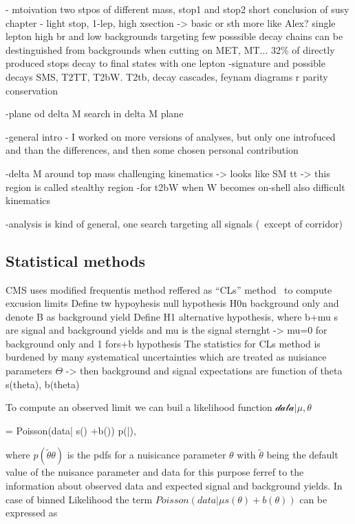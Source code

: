 - mtoivation
	two stpos of different mass, stop1 and stop2
	short conclusion of susy chapter - light stop, 1-lep, high xsection -> basic or sth more like Alex?
	single lepton high br and low backgrounds
	targeting few posssible decay chains
	can be destinguished from backgrounds when cutting on MET, MT...
	32\% of directly produced stops decay to final states with one lepton
-signature  and possible decays
	SMS, T2TT, T2bW. T2tb, decay cascades, feynam diagrams
	r parity conservation
	

-plane od delta M
	search in delta M plane


-general intro
	- I worked on more versions of analyses, but only one introfuced and than the differences, and then some chosen personal contribution

-delta M around top mass challenging kinematics -> looks like SM tt -> this region is called stealthy region
-for t2bW when W becomes on-shell also difficult kinematics

-analysis is kind of general, one search targeting all signals (~except of corridor)

\subsection{Statistical methods}

CMS uses modified frequentis method reffered as ``CLs'' method~\cite{Read:2002hq, Junk:1999kv, Cowan:2010js, CMS-NOTE-2011-005} to compute excusion limits
Define tw hypoyhesis null hypothesis H0n background only and denote B as background yield
Define H1 alternative hypothesis, where b+mu s are signal and background yields and mu is the signal sternght -> mu=0 for background only and 1 fors+b hypothesis
The statistics for CLs method is burdened by many systematical uncertainties which are treated as nuisiance parameters $\Theta$ -> then background and signal expectations are function of theta s(theta), b(theta)


To compute an observed limit we can buil a likelihood function $\mathcal{data|\mu, \theta}$

{
 = Poisson(data| \mu s(\theta) +b(\theta)) p(\tilde{\tehta}|\theta),
}

where $p(\tilde{\theta}\theta)$ is the pdfs for a nuisicance parameter $\theta$ with $\tilde{\theta}$ being the default value of the nuisance parameter and data for this purpose ferref to the information about observed data and expected signal and background yields. In case of binned Likelihood the term $Poisson(data| \mu s(\theta) +b(\theta))$ can be expressed as


